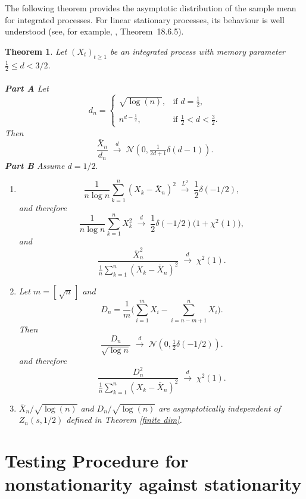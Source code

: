 \documentclass[10pt,a4paper]{amsart}
\numberwithin{equation}{section}
\newtheorem{thm}{Theorem}[section]
\begin{document}
The following theorem provides the asymptotic distribution of the sample mean for integrated processes. For  linear stationary processes, its behaviour is well understood (see, for example, \cite{ibragimov_linnik_1971}, Theorem~18.6.5).
\begin{thm}\label{1 over f1}
Let $(X_t)_{t\ge1}$ be an integrated process with memory parameter $\tfrac12\le d<3/2$.\\\\
{\bf Part A}
Let
$$
d_n=\begin{cases}
    \sqrt{\log(n)},&\textrm{if }d=\frac{1}{2},\\\\n^{d-\frac{1}{2}},&\textrm{if }\frac{1}{2}<d<\frac{3}{2}.
\end{cases}
$$
Then
\[
\frac{\bar X_n}{d_n} \;\xrightarrow{d}\; \mathcal N\!\left(0,\tfrac1{2d+1}\delta(d-1)\right).
\]
{\bf Part B} Assume $d=1/2.$ 
\begin{enumerate}
\item
\[
\frac{1}{n\log n}\sum_{k=1}^n (X_k-\bar X_n)^2
\;\xrightarrow{L^2}\;
\frac12\delta(-1/2),
\]
and therefore
\[
\frac{1}{n\log n}\sum_{k=1}^n X_k^2
\;\xrightarrow{d}\;
\frac12\delta(-1/2)\bigl(1+\chi^2(1)\bigr),
\]
and 
$$
\frac{\bar X_n^2}{\frac{1}{n}\displaystyle\sum_{k=1}^n (X_k-\bar X_n)^2}
\;\xrightarrow{d}\;
\chi^2(1).
$$
\item Let $m=[\,\sqrt{n}\,]$ and
\[
D_n=\frac{1}{m}\Big(\sum_{i=1}^m X_i-\sum_{i=n-m+1}^n X_i\Big).
\]
Then
\[
\frac{D_n}{\sqrt{\log n}} \;\xrightarrow{d}\; \mathcal N\!\left(0,\tfrac12\delta(-1/2)\right).
\]
and therefore
\begin{equation}\label{sample mean ratio}
\frac{D_n^2}{\frac{1}{n}\displaystyle\sum_{k=1}^n (X_k-\bar X_n)^2}
\;\xrightarrow{d}\;
\chi^2(1).
\end{equation}
\item $\bar X_n/\sqrt{\log(n)}$ and $D_n/\sqrt{\log(n)}$ are asymptotically independent of $Z_n(s,1/2)$ defined in Theorem \ref{finite dim}.
\end{enumerate}
\end{thm}
\section{Testing Procedure for  nonstationarity against stationarity }\label{simulation}
\end{document}
